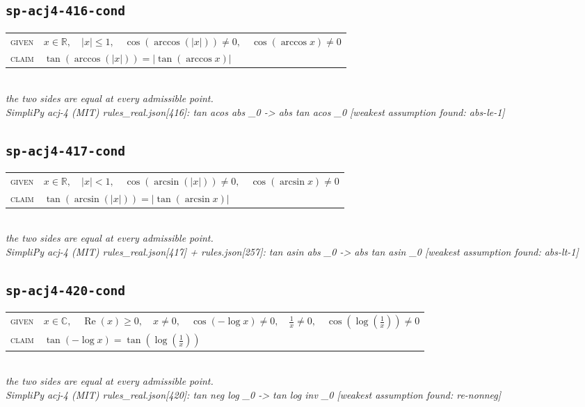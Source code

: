 \documentclass[11pt]{article}
\begin{document}
\subsection*{\texttt{sp-acj4-416-cond}}
\begin{tabular}{@{}l@{\quad}l@{}}
\textsc{given} & $x \in \mathbb{R},\quad \left|x\right| \le 1,\quad \cos\left(\arccos\left(\left|x\right|\right)\right) \neq 0,\quad \cos\left(\arccos x\right) \neq 0$ \\[4pt]
\textsc{claim} & $\displaystyle \tan\left(\arccos\left(\left|x\right|\right)\right) = \left|\tan\left(\arccos x\right)\right|$ \\
\end{tabular}\\[2pt]
{\small\emph{the two sides are equal at every admissible point.}}\\
\emph{SimpliPy acj-4 (MIT) rules\_real.json[416]: tan acos abs \_0  ->  abs tan acos \_0  [weakest assumption found: abs-le-1]}\\

\subsection*{\texttt{sp-acj4-417-cond}}
\begin{tabular}{@{}l@{\quad}l@{}}
\textsc{given} & $x \in \mathbb{R},\quad \left|x\right| < 1,\quad \cos\left(\arcsin\left(\left|x\right|\right)\right) \neq 0,\quad \cos\left(\arcsin x\right) \neq 0$ \\[4pt]
\textsc{claim} & $\displaystyle \tan\left(\arcsin\left(\left|x\right|\right)\right) = \left|\tan\left(\arcsin x\right)\right|$ \\
\end{tabular}\\[2pt]
{\small\emph{the two sides are equal at every admissible point.}}\\
\emph{SimpliPy acj-4 (MIT) rules\_real.json[417] + rules.json[257]: tan asin abs \_0  ->  abs tan asin \_0  [weakest assumption found: abs-lt-1]}\\

\subsection*{\texttt{sp-acj4-420-cond}}
\begin{tabular}{@{}l@{\quad}l@{}}
\textsc{given} & $x \in \mathbb{C},\quad \operatorname{Re}\left(x\right) \ge 0,\quad x \neq 0,\quad \cos\left(-\log x\right) \neq 0,\quad \frac{1}{x} \neq 0,\quad \cos\left(\log\left(\frac{1}{x}\right)\right) \neq 0$ \\[4pt]
\textsc{claim} & $\displaystyle \tan\left(-\log x\right) = \tan\left(\log\left(\frac{1}{x}\right)\right)$ \\
\end{tabular}\\[2pt]
{\small\emph{the two sides are equal at every admissible point.}}\\
\emph{SimpliPy acj-4 (MIT) rules\_real.json[420]: tan neg log \_0  ->  tan log inv \_0  [weakest assumption found: re-nonneg]}\\
\end{document}

